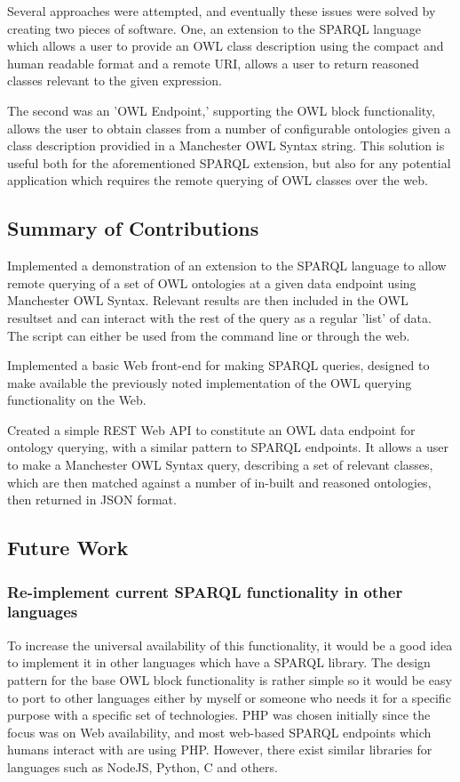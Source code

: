 \documentclass{article}
\begin{document}
Several approaches were attempted, and eventually these issues were solved by
creating two pieces of software. One, an extension to the SPARQL language which
allows a user to provide an OWL class description using the compact and human
readable format and a remote URI, allows a user to return reasoned classes
relevant to the given expression.

The second was an 'OWL Endpoint,' supporting the OWL block functionality, allows
the user to obtain classes from a number of configurable ontologies given a
class description providied in a Manchester OWL Syntax string. This solution is
useful both for the aforementioned SPARQL extension, but also for any potential
application which requires the remote querying of OWL classes over the web.

\subsection{Summary of Contributions}

Implemented a demonstration of an extension to the SPARQL language to allow
remote querying of a set of OWL ontologies at
a given data endpoint using Manchester OWL Syntax. Relevant results are then
included in the OWL resultset and can
interact with the rest of the query as a regular 'list' of data. The script can
either be used from the command line or
through the web.

Implemented a basic Web front-end for making SPARQL queries, designed to make
available the previously noted implementation of
the OWL querying functionality on the Web.

Created a simple REST Web API to constitute an OWL data endpoint for ontology
querying, with a similar pattern to SPARQL
endpoints. It allows a user to make a Manchester OWL Syntax query, describing a
set of relevant classes, which are then
matched against a number of in-built and reasoned ontologies, then returned in
JSON format.

\subsection{Future Work}

\subsubsection{Re-implement current SPARQL functionality in other languages}

To increase the universal availability of this functionality, it would be a good
idea to implement it in other languages which
have a SPARQL library. The design pattern for the base OWL block functionality
is rather simple so it would be easy to port
to other languages either by myself or someone who needs it for a specific
purpose with a specific set of technologies. PHP
was chosen initially since the focus was on Web availability, and most web-based
SPARQL endpoints which humans interact with
are using PHP. However, there exist similar libraries for languages such as
NodeJS, Python, C and others.
\end{document}
